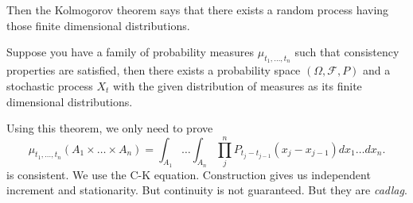 Then the Kolmogorov theorem says that there exists a random process having those finite dimensional distributions.


\begin{theorem}
	Suppose you have a family of probability measures  $\mu_{t_1, \ldots, t_n}$ such that consistency properties are satisfied, then there exists a probability space $(\Omega, \mathcal{F}, P)$ and a stochastic process $X_t$ with the given distribution of measures as its finite dimensional distributions.
\end{theorem}

Using this theorem, we only need to prove
\[
	\mu_{t_1, \ldots, t_n}\left( A_1 \times \ldots\times A_n \right) 
	= \int _{A_1} \ldots \int _{A_n} \prod_{j}^{n} P_{t_j - t_{j-1}}(x_j - x_{j-1}) dx_1 \ldots d x_n 
.\] 
is consistent. We use the C-K equation. Construction gives us independent increment and stationarity. But continuity is not guaranteed. But they are \textit{cadlag}.
